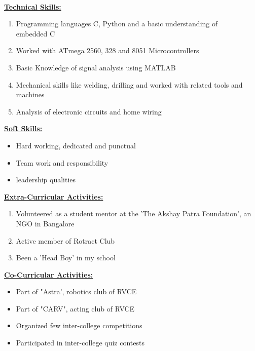 \documentclass[10pt]{article}
\begin{document}
		
	
		\\
		
		\underline{\textbf{\Large{Technical Skills:}}}
		\begin{enumerate}
			\item{Programming languages C, Python and a basic understanding of \\embedded C}
			\item{Worked with ATmega 2560, 328 and 8051 Microcontrollers}
			\item {Basic Knowledge of signal analysis using MATLAB}
			\item{Mechanical skills like welding, drilling and worked with related tools and machines}
			\item{Analysis of electronic circuits and home wiring}
		\end{enumerate}
		
		\hfill 
		\hfill
	
			\underline{\textbf{\Large{Soft Skills:}}}
			\begin{itemize}
				\item{Hard working, dedicated and punctual}
				\item{Team work and responsibility}
				\item{leadership qualities}\\ 
			\end{itemize}
			\vspace{1cm}
			\hfill
			
		\underline{\textbf{\Large{Extra-Curricular Activities:}}}
		\begin{enumerate}
			\item{Volunteered as a student mentor at the 'The Akshay Patra Foundation', an NGO in Bangalore}
			\item {Active member of Rotract Club}
			\item{Been a 'Head Boy' in my school}	
		\end{enumerate}
		
		\hfill
		
			\underline{\textbf{\Large{Co-Curricular Activities:}}}
			\begin{itemize}
				\item{Part of "Astra', robotics club of RVCE}
				\item{Part of "CARV", acting club of RVCE}
				\item{Organized few inter-college competitions}
				\item{Participated in inter-college quiz contests}\\		
			\end{itemize}
			
\end{document}
